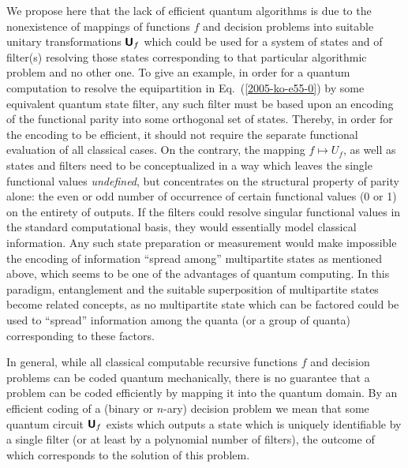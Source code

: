 We propose here that the lack of efficient quantum algorithms
is due to the nonexistence of
mappings of functions $f$ and decision problems into suitable unitary
transformations
$
\textsf{\textbf{U}}_f
$
which could be used for
a system of states and of filter(s) resolving those states corresponding to that particular
algorithmic problem and no other one.
To give an example, in order for a quantum computation to
resolve the equipartition in Eq.~(\ref{2005-ko-e55-0})
by some equivalent quantum state filter,
any such filter must be based upon an encoding of the functional parity
into some orthogonal set of states.
Thereby, in order for the encoding to be efficient, it should not require the
separate functional evaluation of all classical cases.
On the contrary, the mapping $f \mapsto U_f$, as well as
states and filters need to be conceptualized
in a way which leaves the single functional values {\em undefined},
but concentrates on the structural property of parity alone:
the even or odd number of occurrence of certain functional values (0 or 1)
on the entirety of outputs.
If the filters could resolve singular functional values
in the standard computational basis,
they would essentially model classical information.
Any such state preparation or measurement
would make impossible the encoding of information
``spread among'' multipartite states as mentioned above,
which seems to be one of the advantages of quantum computing.
In this paradigm, entanglement and the suitable superposition of multipartite states
become related concepts, as no multipartite state which can be factored
could be used to ``spread'' information among the quanta (or a group of quanta) corresponding to these factors.

In general, while all classical computable recursive functions
$f$ and decision problems can be coded quantum mechanically, there is no guarantee
that a problem can be coded efficiently by mapping it into the quantum domain.
By an efficient coding of a (binary or $n$-ary) decision
problem  we mean that some quantum circuit
$\textsf{\textbf{U}}_f$ exists
which outputs a state which is uniquely identifiable by a single filter
(or at least by a polynomial number of filters),
the outcome of which corresponds to the solution of this problem.



